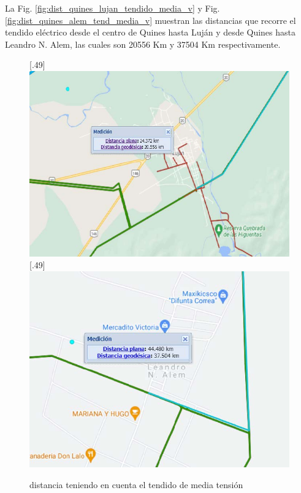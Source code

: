 \documentclass[11pt,a4paper]{article}
\begin{document}
La Fig. \ref{fig:dist_quines_lujan_tendido_media_v} y Fig. \ref{fig:dist_quines_alem_tend_media_v} muestran las distancias que recorre el tendido eléctrico desde el centro de Quines hasta Luján y desde Quines hasta Leandro N. Alem, las cuales son 20556 Km y 37504 Km respectivamente. 

\begin{figure}[ht!]
  \centering
  [.49\linewidth]{\includegraphics[height=11\baselineskip]{fotos_ema/dist_quines_lujan_tendido_media_v.jpg}}
  \hfill
  [.49\linewidth]{\includegraphics[height=11\baselineskip]{fotos_ema/dist_quines_alem_tend_media_v.jpg}}
  \caption{distancia teniendo en cuenta el tendido de media tensión}
  \label{fig:dist_tendido_media_tension}
\end{figure}
\end{document}

